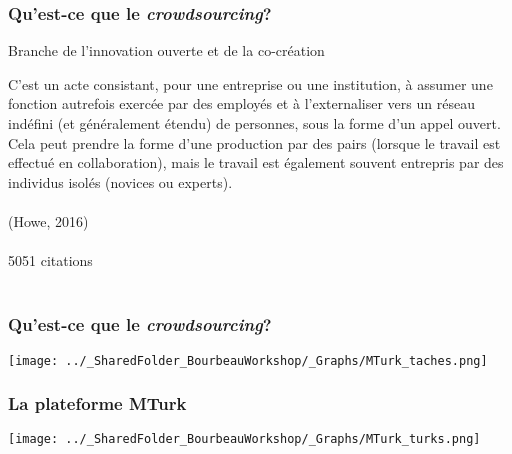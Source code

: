\documentclass{beamer}
\begin{document}
    \begin{frame}
    
      \frametitle{Qu’est-ce que le \emph{crowdsourcing}?} \vspace{1cm}
      
    Branche de l’innovation ouverte et de la co-création
    
    \begin{center}
		C'est un acte consistant, pour une entreprise ou une institution, à assumer une fonction autrefois exercée par des employés et à l'externaliser vers un réseau indéfini (et généralement étendu) de personnes, sous la forme d'un appel ouvert. Cela peut prendre la forme d'une production par des pairs (lorsque le travail est effectué en collaboration), mais le travail est également souvent entrepris par des individus isolés (novices ou experts). \\~\\
		(Howe, 2016)  \\~\\
		5051 citations \\~\\
    \end{center}
         
    \end{frame}  
    
    

    \begin{frame}
    
      \frametitle{Qu’est-ce que le \emph{crowdsourcing}?} \vspace{1cm}
      
       \begin{center}
         \texttt{[image: ../\_SharedFolder\_BourbeauWorkshop/\_Graphs/MTurk\_taches.png]}
        \end{center} 
   
         
    \end{frame}  
    

    \begin{frame}
    
      \frametitle{La plateforme MTurk} \vspace{1cm}

       \begin{center}
         \texttt{[image: ../\_SharedFolder\_BourbeauWorkshop/\_Graphs/MTurk\_turks.png]}
        \end{center} 
   
         
    \end{frame}  
    
\end{document}
